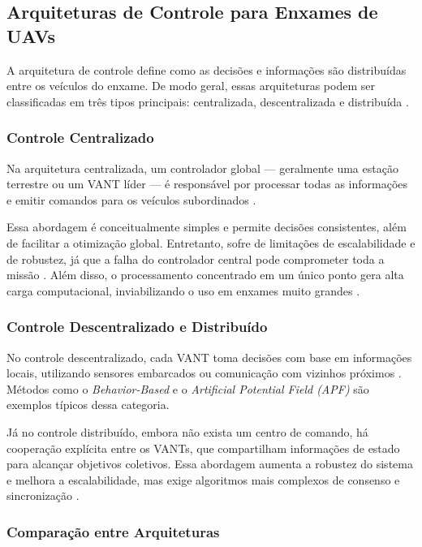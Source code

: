 \documentclass[portuguese]{sbcreviews-2025}%
\begin{document}
\subsection{Arquiteturas de Controle para Enxames de UAVs}

A arquitetura de controle define como as decisões e informações são distribuídas entre os veículos do enxame. De modo geral, essas arquiteturas podem ser classificadas em três tipos principais: centralizada, descentralizada e distribuída \cite{bu2024advancement}.

\subsubsection{Controle Centralizado}

Na arquitetura centralizada, um controlador global — geralmente uma estação terrestre ou um VANT líder — é responsável por processar todas as informações e emitir comandos para os veículos subordinados \cite{ouyang2023formation, bu2024advancement}.

Essa abordagem é conceitualmente simples e permite decisões consistentes, além de facilitar a otimização global. Entretanto, sofre de limitações de escalabilidade e de robustez, já que a falha do controlador central pode comprometer toda a missão \cite{bu2024advancement}. Além disso, o processamento concentrado em um único ponto gera alta carga computacional, inviabilizando o uso em enxames muito grandes \cite{ouyang2023formation}.

\subsubsection{Controle Descentralizado e Distribuído}

No controle descentralizado, cada VANT toma decisões com base em informações locais, utilizando sensores embarcados ou comunicação com vizinhos próximos \cite{bu2024advancement}. Métodos como o \textit{Behavior-Based} e o \textit{Artificial Potential Field (APF)} são exemplos típicos dessa categoria.

Já no controle distribuído, embora não exista um centro de comando, há cooperação explícita entre os VANTs, que compartilham informações de estado para alcançar objetivos coletivos. Essa abordagem aumenta a robustez do sistema e melhora a escalabilidade, mas exige algoritmos mais complexos de consenso e sincronização \cite{bu2024advancement, ouyang2023formation}.

\subsubsection{Comparação entre Arquiteturas}
\end{document}
